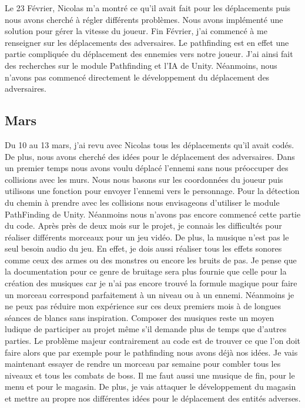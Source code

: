 \documentclass[]{extarticle}
\begin{document}
\begin{spacing}{1.25}
Le 23 Février, Nicolas m’a montré ce qu’il avait fait pour les déplacements puis nous avons cherché à régler différents problèmes. Nous avons implémenté une solution pour gérer la vitesse du joueur.
\bigbreak
\bigbreak
Fin Février, j’ai commencé à me renseigner sur les déplacements des adversaires. Le pathfinding est en effet une partie compliquée du déplacement des ennemies vers notre joueur. J’ai ainsi fait des recherches sur le module Pathfinding et l’IA de Unity. Néanmoins, nous n’avons pas commencé directement le développement du déplacement des adversaires.
\bigbreak
\bigbreak
\bigbreak
\bigbreak

\subsection{Mars}
\bigbreak
\bigbreak
Du 10 au 13 mars, j’ai revu avec Nicolas tous les déplacements qu’il avait codés. De plus, nous avons cherché des idées pour le déplacement des adversaires. Dans un premier temps nous avons voulu déplacé l’ennemi sans nous préoccuper des collisions avec les murs. Nous nous basons sur les coordonnées du joueur puis utilisons une fonction pour envoyer l’ennemi vers le personnage. 
\bigbreak
Pour la détection du chemin à prendre avec les collisions nous envisageons d’utiliser le module PathFinding de Unity. Néanmoins nous n’avons pas encore commencé cette partie du code.
\bigbreak
Après près de deux mois sur le projet, je connais les difficultés pour réaliser différents morceaux pour un jeu vidéo. De plus, la musique n’est pas le seul besoin audio du jeu. En effet, je dois aussi réaliser tous les effets sonores comme ceux des armes ou des monstres ou encore les bruits de pas. Je pense que la documentation pour ce genre de bruitage sera plus fournie que celle pour la création des musiques car je n’ai pas encore trouvé la formule magique pour faire un morceau correspond parfaitement à un niveau ou à un ennemi. 
\bigbreak
Néanmoins je ne peux pas réduire mon expérience sur ces deux premiers mois à de longues séances de blancs sans inspiration. Composer des musiques reste un moyen ludique de participer au projet même s’il demande plus de temps que d’autres parties. Le problème majeur contrairement au code est de trouver ce que l’on doit faire alors que par exemple pour le pathfinding nous avons déjà nos idées.
\bigbreak
Je vais maintenant essayer de rendre un morceau par semaine pour combler tous les niveaux et tous les combats de boss. Il me faut aussi une musique de fin, pour le menu et pour le magasin. 
\bigbreak
De plus, je vais attaquer le développement du magasin et mettre au propre nos différentes idées pour le déplacement des entités adverses.
\newpage


\end{spacing}
\end{document}
